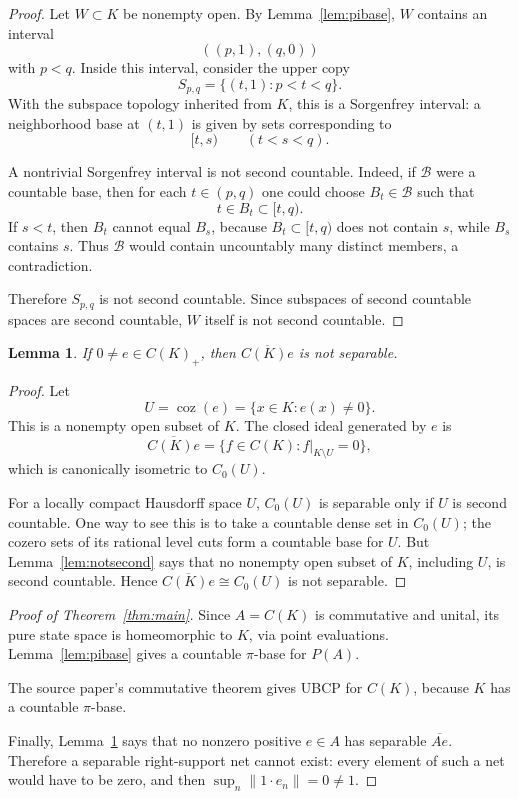 \documentclass[11pt]{article}
\newtheorem{lemma}{Lemma}
\newcommand{\coz}{\operatorname{coz}}
\newcommand{\cl}{\overline}
\begin{document}
\begin{proof}
Let \(W\subset K\) be nonempty open.  By Lemma~\ref{lem:pibase}, \(W\)
contains an interval
\[
        ((p,1),(q,0))
\]
with \(p<q\).  Inside this interval, consider the upper copy
\[
        S_{p,q}=\{(t,1):p<t<q\}.
\]
With the subspace topology inherited from \(K\), this is a Sorgenfrey
interval: a neighborhood base at \((t,1)\) is given by sets corresponding to
\[
        [t,s)
        \qquad(t<s<q).
\]

A nontrivial Sorgenfrey interval is not second countable.  Indeed, if
\(\mathcal B\) were a countable base, then for each \(t\in(p,q)\) one could
choose \(B_t\in\mathcal B\) such that
\[
        t\in B_t\subset [t,q).
\]
If \(s<t\), then \(B_t\) cannot equal \(B_s\), because \(B_t\subset[t,q)\)
does not contain \(s\), while \(B_s\) contains \(s\).  Thus
\(\mathcal B\) would contain uncountably many distinct members, a
contradiction.

Therefore \(S_{p,q}\) is not second countable.  Since subspaces of second
countable spaces are second countable, \(W\) itself is not second countable.
\end{proof}

\begin{lemma}
\label{lem:principal}
If \(0\ne e\in C(K)_+\), then \(\cl{C(K)e}\) is not separable.
\end{lemma}

\begin{proof}
Let
\[
        U=\coz(e)=\{x\in K:e(x)\ne0\}.
\]
This is a nonempty open subset of \(K\).  The closed ideal generated by \(e\)
is
\[
        \cl{C(K)e}
        =
        \{f\in C(K): f|_{K\setminus U}=0\},
\]
which is canonically isometric to \(C_0(U)\).

For a locally compact Hausdorff space \(U\), \(C_0(U)\) is separable only if
\(U\) is second countable.  One way to see this is to take a countable dense
set in \(C_0(U)\); the cozero sets of its rational level cuts form a
countable base for \(U\).  But Lemma~\ref{lem:notsecond} says that no
nonempty open subset of \(K\), including \(U\), is second countable.  Hence
\(\cl{C(K)e}\cong C_0(U)\) is not separable.
\end{proof}

\begin{proof}[Proof of Theorem~\ref{thm:main}]
Since \(A=C(K)\) is commutative and unital, its pure state space is
homeomorphic to \(K\), via point evaluations.  Lemma~\ref{lem:pibase} gives a
countable \(\pi\)-base for \(P(A)\).

The source paper's commutative theorem gives UBCP for \(C(K)\), because
\(K\) has a countable \(\pi\)-base.

Finally, Lemma~\ref{lem:principal} says that no nonzero positive \(e\in A\)
has separable \(\cl{Ae}\).  Therefore a separable right-support net cannot
exist: every element of such a net would have to be zero, and then
\(\sup_n\|1\cdot e_n\|=0\ne1\).
\end{proof}
\end{document}
